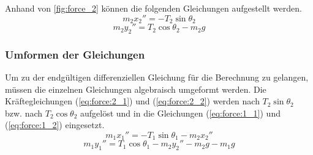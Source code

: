 \documentclass[12pt]{article}
\numberwithin{equation}{subsection}
\begin{document}
Anhand von \autoref{fig:force_2} können die folgenden Gleichungen aufgestellt werden.
\begin{equation} \label{eq:force:2_1}
	m_2 x_2'' = -T_2\sin\theta_2
\end{equation}
\begin{equation} \label{eq:force:2_2}
	m_2 y_2'' = T_2\cos\theta_2 - m_2 g
\end{equation}

\subsubsection{Umformen der Gleichungen}
Um zu der endgültigen differenziellen Gleichung für die Berechnung zu gelangen, müssen die einzelnen Gleichungen algebraisch umgeformt werden. Die Kräftegleichungen (\ref{eq:force:2_1}) und (\ref{eq:force:2_2}) werden nach $T_2\sin\theta_2$ bzw. nach $T_2\cos\theta_2$ aufgelöst und in die Gleichungen (\ref{eq:force:1_1}) und (\ref{eq:force:1_2}) eingesetzt.
\begin{equation} \label{eq:dForce:1}
	m_1 x_1'' = -T_1\sin\theta_1 - m_2 x_2''
\end{equation}
\begin{equation} \label{eq:dForce:2}
	m_1 y_1'' = T_1\cos\theta_1 -m_2 y_2'' - m_2 g - m_1 g
\end{equation}
\end{document}
